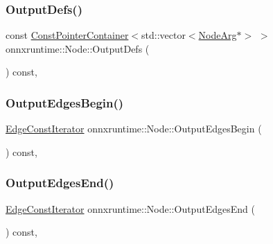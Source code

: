 \subsubsection{\texorpdfstring{Output\+Defs()}{OutputDefs()}}
{\footnotesize\ttfamily const \mbox{\hyperlink{classonnxruntime_1_1ConstPointerContainer}{Const\+Pointer\+Container}}$<$std\+::vector$<$\mbox{\hyperlink{classonnxruntime_1_1NodeArg}{Node\+Arg}}$\ast$$>$ $>$ onnxruntime\+::\+Node\+::\+Output\+Defs (\begin{DoxyParamCaption}{ }\end{DoxyParamCaption}) const\hspace{0.3cm}{\ttfamily [inline]}, {\ttfamily [noexcept]}}

\mbox{\label{classonnxruntime_1_1Node_a45938369e281e8ad422fb22a0f19d5f1}} 
\subsubsection{\texorpdfstring{Output\+Edges\+Begin()}{OutputEdgesBegin()}}
{\footnotesize\ttfamily \mbox{\hyperlink{classonnxruntime_1_1Node_ae0df52e26b0237505b6a0cbc25106d9d}{Edge\+Const\+Iterator}} onnxruntime\+::\+Node\+::\+Output\+Edges\+Begin (\begin{DoxyParamCaption}{ }\end{DoxyParamCaption}) const\hspace{0.3cm}{\ttfamily [inline]}, {\ttfamily [noexcept]}}

\mbox{\label{classonnxruntime_1_1Node_afcbfde06c0db5ae3a174676e5c5dfa6d}} 
\subsubsection{\texorpdfstring{Output\+Edges\+End()}{OutputEdgesEnd()}}
{\footnotesize\ttfamily \mbox{\hyperlink{classonnxruntime_1_1Node_ae0df52e26b0237505b6a0cbc25106d9d}{Edge\+Const\+Iterator}} onnxruntime\+::\+Node\+::\+Output\+Edges\+End (\begin{DoxyParamCaption}{ }\end{DoxyParamCaption}) const\hspace{0.3cm}{\ttfamily [inline]}, {\ttfamily [noexcept]}}

